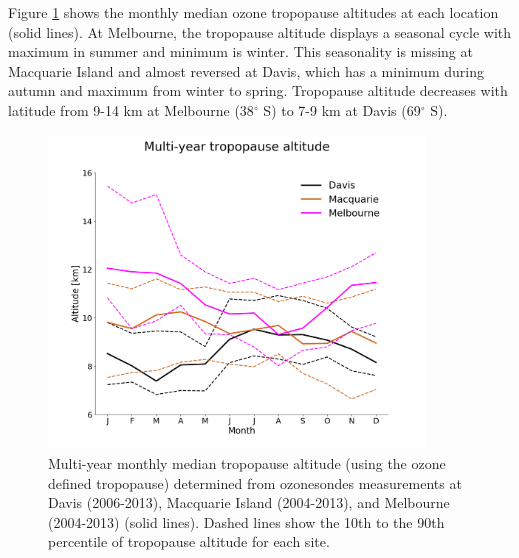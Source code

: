 \documentclass[acp, manuscript]{copernicus} %
\begin{document}
    Figure \ref{fig:seasonaltpheights} shows the monthly median ozone tropopause altitudes at each location (solid lines).
    At Melbourne, the tropopause altitude displays a seasonal cycle with maximum in summer and minimum is winter.
    This seasonality is missing at Macquarie Island and almost reversed at Davis, which has a minimum during autumn and maximum from winter to spring.
    Tropopause altitude decreases with latitude from 9-14 km at Melbourne (38$^\circ$ S) to 7-9 km at Davis (69$^\circ$ S).

    \begin{figure}[t] 
      \includegraphics[width=10cm]{figures/tpheights.png}
      \caption{%
	Multi-year monthly median tropopause altitude (using the ozone defined tropopause) determined from ozonesondes measurements at Davis (2006-2013), Macquarie Island (2004-2013), and Melbourne (2004-2013) (solid lines).
	Dashed lines show the 10th to the 90th percentile of tropopause altitude for each site.}
      \label{fig:seasonaltpheights}
    \end{figure}
\end{document}
